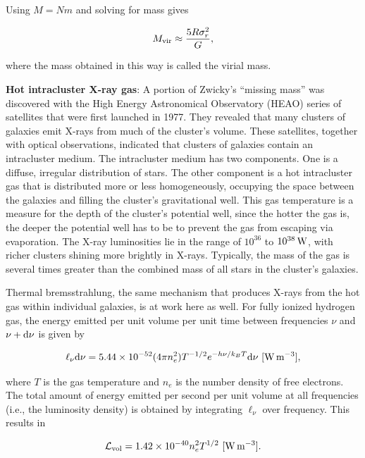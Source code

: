 \documentclass[a4paper,10pt]{article}
\begin{document}
{\noindent}Using $M=Nm$ and solving for mass gives

\begin{align*}
    M_{\rm vir} \approx \frac{5R\sigma_r^2}{G},
\end{align*}

{\noindent}where the mass obtained in this way is called the virial mass.

{\noindent}\textbf{Hot intracluster X-ray gas}: A portion of Zwicky's ``missing mass'' was discovered with the High Energy Astronomical Observatory (HEAO) series of satellites that were first launched in 1977. They revealed that many clusters of galaxies emit X-rays from much of the cluster's volume. These satellites, together with optical observations, indicated that clusters of galaxies contain an intracluster medium. The intracluster medium has two components. One is a diffuse, irregular distribution of stars. The other component is a hot intracluster gas that is distributed more or less homogeneously, occupying the space between the galaxies and filling the cluster's gravitational well. This gas temperature is a measure for the depth of the cluster's potential well, since the hotter the gas is, the deeper the potential well has to be to prevent the gas from escaping via evaporation. The X-ray luminosities lie in the range of $10^{36}$ to $10^{38}\,{\rm W}$, with richer clusters shining more brightly in X-rays. Typically, the mass of the gas is several times greater than the combined mass of all stars in the cluster's galaxies.

{\noindent}Thermal bremsstrahlung, the same mechanism that produces X-rays from the hot gas within individual galaxies, is at work here as well. For fully ionized hydrogen gas, the energy emitted per unit volume per unit time between frequencies $\nu$ and $\nu+{\rm d}\nu$ is given by

\begin{align*}
    \ell_\nu{\rm d}\nu = 5.44\times10^{-52}(4\pi n_e^2) T^{-1/2} e^{-h\nu/k_BT}{\rm d}\nu ~ [{\rm W\,m^{-3}}],
\end{align*}

{\noindent}where $T$ is the gas temperature and $n_e$ is the number density of free electrons. The total amount of energy emitted per second per unit volume at all frequencies (i.e., the luminosity density) is obtained by integrating $\ell_\nu$ over frequency. This results in

\begin{align*}
    \mathcal{L}_{\rm vol} = 1.42\times10^{-40}n_e^2T^{1/2} ~ [{\rm W\,m^{-3}}].
\end{align*}
\end{document}
